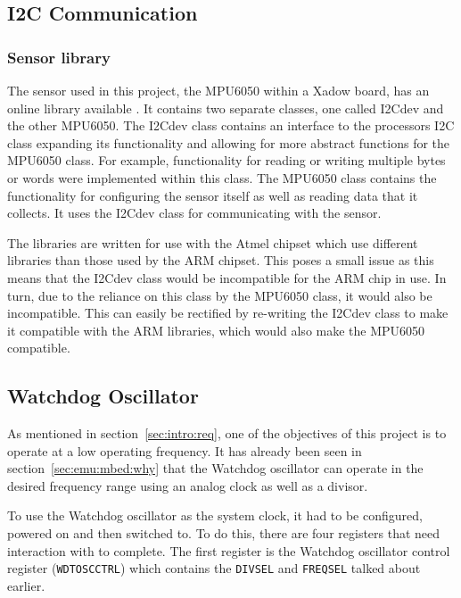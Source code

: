 
\subsection{I2C Communication}

\subsubsection{Sensor library}
\label{sec:mbed:i2c:lib}

The  sensor used in this project, the MPU6050 within a Xadow board, has an online library available \cite{sensory_library}. It contains two separate classes, one called I2Cdev and the other MPU6050. The I2Cdev class contains an interface to the processors I2C class expanding its functionality and allowing for more abstract functions for the MPU6050 class. For example, functionality for reading or writing multiple bytes or words were implemented within this class. The MPU6050 class contains the functionality for configuring the sensor itself as well as reading data that it collects. It uses the I2Cdev class for communicating with the sensor.

The libraries are written for use with the Atmel chipset which use different libraries than those used by the ARM chipset. This poses a small issue as this means that the I2Cdev class would be incompatible for the ARM chip in use. In turn, due to the reliance on this class by the MPU6050 class, it would also be incompatible. This can easily be rectified by re-writing the I2Cdev class to make it compatible with the ARM libraries, which would also make the MPU6050 compatible.

\subsection{Watchdog Oscillator}

As mentioned in section~\ref{sec:intro:req}, one of the objectives of this project is to operate at a low operating frequency. It has already been seen in section~\ref{sec:emu:mbed:why} that the Watchdog oscillator can operate in the desired frequency range using an analog clock as well as a divisor. 

To use the Watchdog oscillator as the system clock, it had to be configured, powered on and then switched to. To do this, there are four registers that need interaction with to complete. The first register is the Watchdog oscillator control register (\verb|WDTOSCCTRL|) which contains the \verb|DIVSEL| and \verb|FREQSEL| talked about earlier. 

